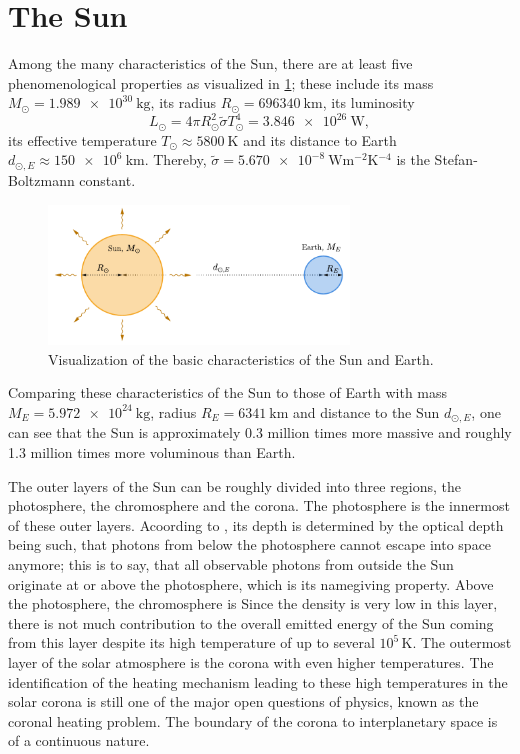 \documentclass[a4paper,12pt]{report}
\def\lk#1{{\color{black}{#1}}}
\begin{document}
\section{The Sun}
Among the many characteristics of the Sun, there are at least five phenomenological properties as visualized in \cref{fig:SunEarth}; these include its mass $M_\odot = \SI{1.989e30}{\kilogram}$, its radius $R_\odot = \SI{696340}{\kilo\meter}$, its luminosity \begin{equation}L_\odot = 4\pi R_\odot^2 \tilde{\sigma} T_\odot^4 = \SI{3.846e26}{\watt},
\end{equation} its effective temperature $T_{\odot} \approx \SI{5800}{\kelvin}$ and its distance to Earth $d_{\odot,E} \approx \SI{150e6}{\kilo\meter}$. Thereby, $\tilde{\sigma} = \SI{5.670e-8}{\watt\meter^{-2}\kelvin^{-4}}$ is the Stefan-Boltzmann constant.
\begin{figure}[h]
\centering
\includegraphics[width=8cm]{figures/SunEarth.pdf}
\caption{Visualization of the basic characteristics of the Sun and Earth.}
\label{fig:SunEarth}
\end{figure}
Comparing these characteristics of the Sun to those of Earth with mass $M_E = \SI{5.972e24}{\kilogram}$, radius $R_E = \SI{6341}{\kilo\meter}$ and distance to the Sun $d_{\odot,E}$, one can see that the Sun is approximately 0.3 million times more massive and roughly 1.3 million times more voluminous than Earth.


The outer layers of the Sun can be roughly divided into three regions, the photosphere, the chromosphere and the corona. The photosphere is the innermost of these outer layers. Acoording to \cite[p.135]{Weigert.2006}, its depth is determined by the optical depth being such, that photons from below the photosphere cannot escape into space anymore; this is to say, that all observable photons from outside the Sun originate at or above the photosphere, which is its namegiving property. Above the photosphere, the chromosphere is \lk{located.} Since the density is very low in this layer, there is not much contribution to the overall emitted energy of the Sun coming from this layer despite its high temperature of up to several $10^5\,\si{\kelvin}$. The outermost layer of the solar atmosphere is the corona with even higher temperatures. The identification of the heating mechanism leading to these high temperatures in the solar corona is still one of the major open questions of \lk{solar} physics, known as the coronal heating problem. The boundary of the corona to interplanetary space is of a continuous nature.
\end{document}
